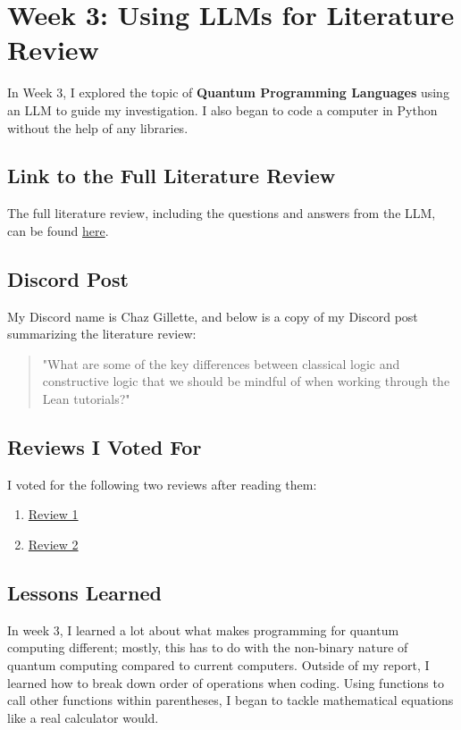 \documentclass{article}
\begin{document}
\section{Week 3: Using LLMs for Literature Review}
\label{sec:week3}

In Week 3, I explored the topic of \textbf{Quantum Programming Languages} using an LLM to guide my investigation. I also began to code a computer in Python without the help of any libraries.

\subsection*{Link to the Full Literature Review}
The full literature review, including the questions and answers from the LLM, can be found \href{https://github.com/cgillette/CPSC-354/blob/main/week3/README.md}{here}.

\subsection*{Discord Post}

My Discord name is Chaz Gillette, and below is a copy of my Discord post summarizing the literature review:

\begin{quote}
\small
"What are some of the key differences between classical logic and constructive logic that we should be mindful of when working through the Lean tutorials?"
\end{quote}

\subsection*{Reviews I Voted For}
I voted for the following two reviews after reading them:

\begin{enumerate}
    \item \href{https://github.com/mdrivas/CPSC353-Assignment3/blob/main/README.md}{Review 1}
    \item \href{https://github.com/ATacoDev/LitReview354}{Review 2}
\end{enumerate}

\subsection*{Lessons Learned}
In week 3, I learned a lot about what makes programming for quantum computing different; mostly, this has to do with the non-binary nature of quantum computing compared to current computers. Outside of my report, I learned how to break down order of operations when coding. Using functions to call other functions within parentheses, I began to tackle mathematical equations like a real calculator would.
\end{document}
